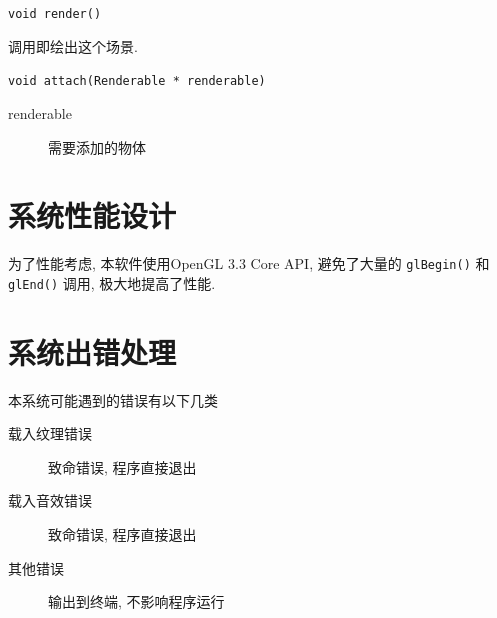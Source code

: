 \documentclass[11pt]{article}
\begin{document}
\texttt{void render()}

调用即绘出这个场景.

\texttt{void attach(Renderable * renderable)}
\begin{description}
\item[{renderable}] 需要添加的物体
\end{description}
\section{系统性能设计}
\label{sec-5}
为了性能考虑, 本软件使用OpenGL 3.3 Core API, 避免了大量的
\texttt{glBegin()} 和 \texttt{glEnd()} 调用, 极大地提高了性能.  
\section{系统出错处理}
\label{sec-6}
本系统可能遇到的错误有以下几类
\begin{description}
\item[{载入纹理错误}] 致命错误, 程序直接退出
\item[{载入音效错误}] 致命错误, 程序直接退出
\item[{其他错误}] 输出到终端, 不影响程序运行
\end{description}
\end{document}
